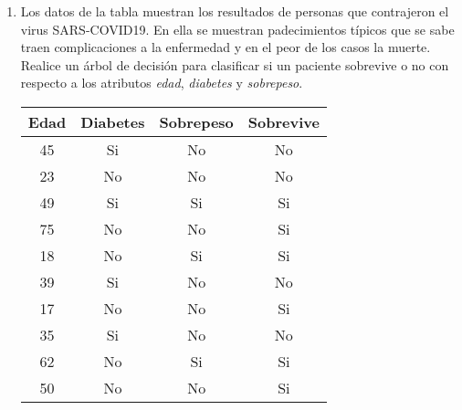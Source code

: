 \documentclass[
10pt, %
a4paper, %
]{article}
\begin{document}
\begin{enumerate}
    \item Los datos de la tabla muestran los resultados de personas que contrajeron el virus SARS-COVID19. En ella se muestran 
	padecimientos típicos que se sabe traen complicaciones a la enfermedad y en el peor de los casos la muerte. 
	Realice un árbol de decisión para clasificar si un paciente sobrevive o no con respecto a los 
	atributos \textit{edad}, \textit{diabetes} y \textit{sobrepeso}. 
        \begin{table}[H]
            \centering 
            \begin{tabular}{cccc}
                \toprule
                Edad & Diabetes & Sobrepeso & Sobrevive \\ \midrule
                45 & Si & No & No \\
                23 & No & No & No \\
                49 & Si & Si & Si \\
                75 & No & No & Si \\
                18 & No & Si & Si \\
                39 & Si & No & No \\
                17 & No & No & Si \\
                35 & Si & No & No \\
                62 & No & Si & Si \\
                50 & No & No & Si \\
                \bottomrule
            \end{tabular}
        \end{table}


\end{enumerate}
\end{document}
